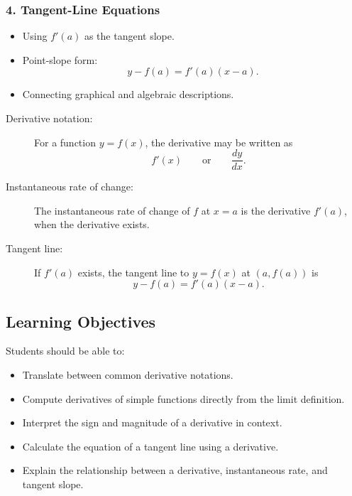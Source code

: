 \documentclass{article}
\begin{document}
\subsubsection*{4. Tangent-Line Equations}

\begin{itemize}
    \item Using $f'(a)$ as the tangent slope.
    \item Point-slope form:
    \[
        y-f(a)=f'(a)(x-a).
    \]
    \item Connecting graphical and algebraic descriptions.
\end{itemize}

\begin{tcolorbox}[title=Key Definitions]
\begin{description}
    \item[Derivative notation:] For a function $y=f(x)$, the derivative may be written as
    \[
        f'(x)
        \qquad\text{or}\qquad
        \frac{dy}{dx}.
    \]

    \item[Instantaneous rate of change:] The instantaneous rate of change of $f$ at $x=a$ is the derivative $f'(a)$, when the derivative exists.

    \item[Tangent line:] If $f'(a)$ exists, the tangent line to $y=f(x)$ at $(a,f(a))$ is
    \[
        y-f(a)=f'(a)(x-a).
    \]
\end{description}
\end{tcolorbox}

\subsection*{Learning Objectives}

Students should be able to:

\begin{itemize}
    \item Translate between common derivative notations.
    \item Compute derivatives of simple functions directly from the limit definition.
    \item Interpret the sign and magnitude of a derivative in context.
    \item Calculate the equation of a tangent line using a derivative.
    \item Explain the relationship between a derivative, instantaneous rate, and tangent slope.
\end{itemize}
\end{document}

